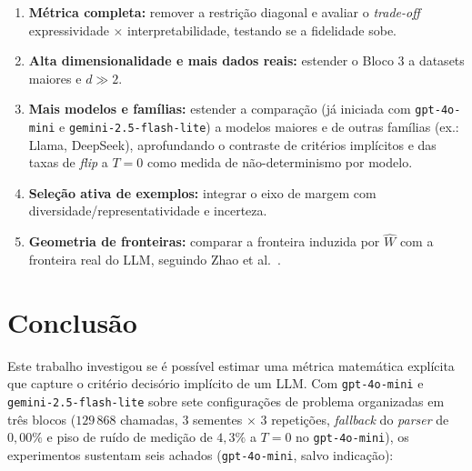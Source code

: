\documentclass[12pt,a4paper]{article}
\newcommand{\West}{\ensuremath{\hat{W}}}   %
\begin{document}
\begin{enumerate}
  \item \textbf{Métrica completa:} remover a restrição diagonal e avaliar o \emph{trade-off}
    expressividade $\times$ interpretabilidade, testando se a fidelidade sobe.
  \item \textbf{Alta dimensionalidade e mais dados reais:} estender o Bloco 3 a datasets
    maiores e $d \gg 2$.
  \item \textbf{Mais modelos e famílias:} estender a comparação (já iniciada com
    \texttt{gpt-4o-mini} e \texttt{gemini-2.5-flash-lite}) a modelos maiores e de outras
    famílias (ex.: Llama, DeepSeek), aprofundando o contraste de critérios implícitos e das
    taxas de \emph{flip} a $T=0$ como medida de não-determinismo por modelo.
  \item \textbf{Seleção ativa de exemplos:} integrar o eixo de margem
    \cite{minRethinkingRole2022} com diversidade/representatividade
    \cite{suSelectiveAnnotation2023} e incerteza.
  \item \textbf{Geometria de fronteiras:} comparar a fronteira induzida por \West{} com a
    fronteira real do LLM, seguindo Zhao et al.~\cite{zhaoProbing2024}.
\end{enumerate}

\section{Conclusão}
\label{sec:conclusao}

Este trabalho investigou se é possível estimar uma métrica matemática explícita que capture
o critério decisório implícito de um LLM. Com \texttt{gpt-4o-mini} e
\texttt{gemini-2.5-flash-lite} sobre sete configurações de problema organizadas em três
blocos ($129\,868$ chamadas, $3$ sementes $\times$ $3$ repetições, \emph{fallback} do
\emph{parser} de $0{,}00\%$ e piso de ruído de medição de $4{,}3\%$ a $T=0$ no
\texttt{gpt-4o-mini}), os experimentos sustentam seis achados (\texttt{gpt-4o-mini}, salvo
indicação):
\end{document}

